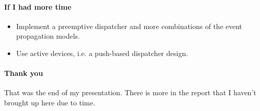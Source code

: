 \documentclass{memoir}
\begin{document}
\paragraph{If I had more time}

\begin{itemize}
    \item Implement a preemptive dispatcher and more combinations of the event
        propagation models.
    \item Use active devices, i.e. a push-based dispatcher design.
\end{itemize}

\paragraph{Thank you}

That was the end of my presentation. There is more in the report that I haven't
brought up here due to time.
\end{document}
